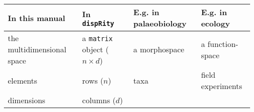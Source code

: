 \documentclass[
]{book}
\begin{document}
\begin{longtable}[]{@{}llll@{}}
\toprule
\begin{minipage}[b]{0.22\columnwidth}\raggedright
In this manual\strut
\end{minipage} & \begin{minipage}[b]{0.22\columnwidth}\raggedright
In \texttt{dispRity}\strut
\end{minipage} & \begin{minipage}[b]{0.26\columnwidth}\raggedright
E.g. in palaeobiology\strut
\end{minipage} & \begin{minipage}[b]{0.19\columnwidth}\raggedright
E.g. in ecology\strut
\end{minipage}\tabularnewline
\midrule
\endhead
\begin{minipage}[t]{0.22\columnwidth}\raggedright
the multidimensional space\strut
\end{minipage} & \begin{minipage}[t]{0.22\columnwidth}\raggedright
a \texttt{matrix} object (\(n\times d\))\strut
\end{minipage} & \begin{minipage}[t]{0.26\columnwidth}\raggedright
a morphospace\strut
\end{minipage} & \begin{minipage}[t]{0.19\columnwidth}\raggedright
a function-space\strut
\end{minipage}\tabularnewline
\begin{minipage}[t]{0.22\columnwidth}\raggedright
elements\strut
\end{minipage} & \begin{minipage}[t]{0.22\columnwidth}\raggedright
rows (\(n\))\strut
\end{minipage} & \begin{minipage}[t]{0.26\columnwidth}\raggedright
taxa\strut
\end{minipage} & \begin{minipage}[t]{0.19\columnwidth}\raggedright
field experiments\strut
\end{minipage}\tabularnewline
\begin{minipage}[t]{0.22\columnwidth}\raggedright
dimensions\strut
\end{minipage} & \begin{minipage}[t]{0.22\columnwidth}\raggedright
columns (\(d\))\strut
\end{minipage} & \begin{minipage}[t]{0.26\columnwidth}\raggedright

\end{minipage}
\end{longtable}
\end{document}
